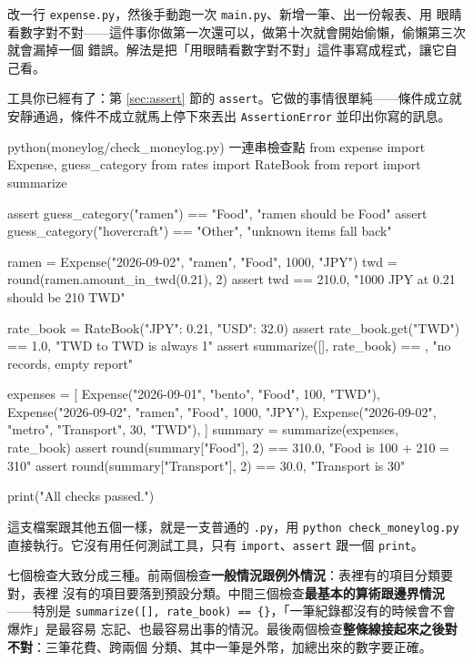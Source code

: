 改一行 \texttt{expense.py}，然後手動跑一次 \texttt{main.py}、新增一筆、出一份報表、用
眼睛看數字對不對——這件事你做第一次還可以，做第十次就會開始偷懶，偷懶第三次就會漏掉一個
錯誤。解法是把「用眼睛看數字對不對」這件事寫成程式，讓它自己看。

工具你已經有了：第 \ref{sec:assert} 節的 \texttt{assert}。它做的事情很單純——條件成立就
安靜通過，條件不成立就馬上停下來丟出 \texttt{AssertionError} 並印出你寫的訊息。

\begin{example}{python}{(moneylog/check\_moneylog.py) 一連串檢查點}
from expense import Expense, guess_category
from rates import RateBook
from report import summarize

assert guess_category("ramen") == "Food", "ramen should be Food"
assert guess_category("hovercraft") == "Other", "unknown items fall back"

ramen = Expense("2026-09-02", "ramen", "Food", 1000, "JPY")
twd = round(ramen.amount_in_twd(0.21), 2)
assert twd == 210.0, "1000 JPY at 0.21 should be 210 TWD"

rate_book = RateBook({"JPY": 0.21, "USD": 32.0})
assert rate_book.get("TWD") == 1.0, "TWD to TWD is always 1"
assert summarize([], rate_book) == {}, "no records, empty report"

expenses = [
    Expense("2026-09-01", "bento", "Food", 100, "TWD"),
    Expense("2026-09-02", "ramen", "Food", 1000, "JPY"),
    Expense("2026-09-02", "metro", "Transport", 30, "TWD"),
]
summary = summarize(expenses, rate_book)
assert round(summary["Food"], 2) == 310.0, "Food is 100 + 210 = 310"
assert round(summary["Transport"], 2) == 30.0, "Transport is 30"

print("All checks passed.")
\end{example}


這支檔案跟其他五個一樣，就是一支普通的 \texttt{.py}，用 \texttt{python check\_moneylog.py}
直接執行。它沒有用任何測試工具，只有 \texttt{import}、\texttt{assert} 跟一個
\texttt{print}。

七個檢查大致分成三種。前兩個檢查\textbf{一般情況跟例外情況}：表裡有的項目分類要對，表裡
沒有的項目要落到預設分類。中間三個檢查\textbf{最基本的算術跟邊界情況}——特別是
\texttt{summarize([], rate\_book) == \{\}}，「一筆紀錄都沒有的時候會不會爆炸」是最容易
忘記、也最容易出事的情況。最後兩個檢查\textbf{整條線接起來之後對不對}：三筆花費、跨兩個
分類、其中一筆是外幣，加總出來的數字要正確。

